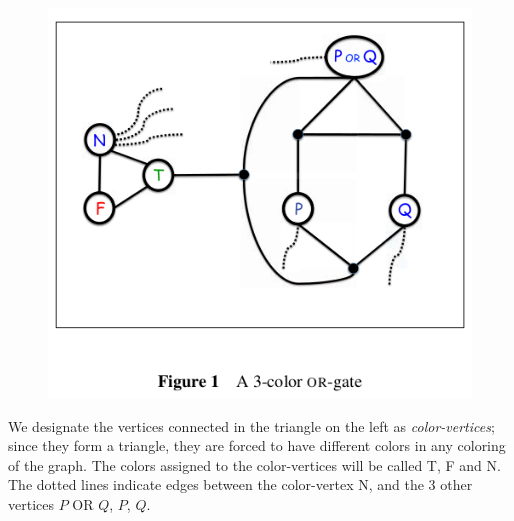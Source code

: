 \documentclass[14pt]{extarticle}
\begin{document}
\begin{figure}[ht!]
\centering
\includegraphics[scale=0.6]{3-color.png}
\end{figure}

We designate the vertices connected in the triangle on the left as {\it color-vertices}; since they form a triangle, they are forced to have different colors in any coloring of the graph. The colors assigned to the color-vertices will be called T, F and N. The dotted lines indicate edges between the color-vertex N, and the 3 other vertices $P$ OR $Q$, $P$, $Q$.
\end{document}
